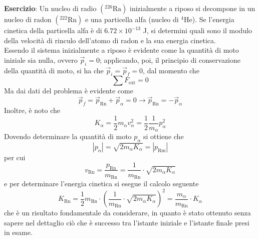 \documentclass[a4paper]{extarticle}
\begin{document}
\vspace{1em}
\noindent
\textbf{Esercizio}: Un nucleo di radio $(^{226}\text{Ra})$ inizialmente a riposo si decompone in un nucleo di radon $(^{222}\text{Rn})$ e una particella alfa (nucleo di $^{4}\text{He}$). Se l'energia cinetica della particella alfa è di $6.72 \times 10^{-13}$ J, si determini quali sono il modulo della velocità di rinculo dell'atomo di radon e la sua energia cinetica.\\
Essendo il sistema inizialmente a riposo è evidente come la quantità di moto iniziale sia nulla, ovvero $\vec p_i = 0$; applicando, poi, il principio di conservazione della quantità di moto, si ha che $\vec p_i = \vec p_f=0$, dal momento che
\[\sum F_{\text{ext}}=0\]
Ma dai dati del problema è evidente come
\[\vec p_f=\vec p_{\text{Rn}} + \vec p_{\alpha}=0 \longrightarrow \vec p_{\text{Rn}} = - \vec p_\alpha\]
Inoltre, è noto che
\[K_\alpha = \frac{1}{2}m_\alpha v_\alpha^2 = \frac{1}{2}\frac{1}{m_\alpha} p_\alpha^2\]
Dovendo determinare la quantità di moto $p_\alpha$ si ottiene che
\[\left \vert p_\alpha \right \vert = \sqrt{2 m_\alpha K_\alpha} = \left \vert p_{\text{Rm}} \right \vert\]
per cui
\[v_{\text{Rn}}=\frac{p_{\text{Rn}}}{m_{\text{Rn}}} = \frac{1}{m_{\text{Rn}}} \cdot \sqrt{2 m_\alpha K_\alpha}\]
e per determinare l'energia cinetica si esegue il calcolo seguente
\[K_{\text{Rn}} = \frac{1}{2}m_{\text{Rn}} \cdot \left( \frac{1}{m_{\text{Rn}}} \cdot \sqrt{2 m_\alpha K_\alpha} \right)^2 = \frac{m_\alpha}{m_{\text{Rn}}} \cdot K_\alpha\]
che è un risultato fondamentale da considerare, in quanto è stato ottenuto senza sapere nel dettaglio ciò che è successo tra l'istante iniziale e l'istante finale presi in esame.
\end{document}
